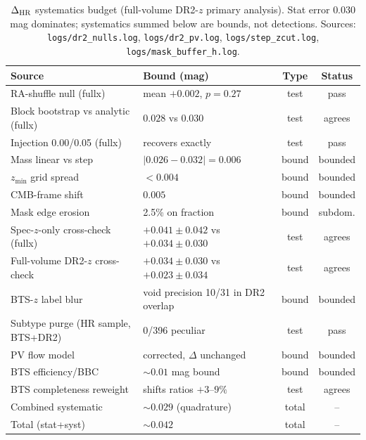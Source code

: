 \begin{table}
\caption{$\Delta_{\rm HR}$ systematics budget (full-volume DR2-$z$ primary analysis). Stat error $0.030$ mag dominates; systematics summed below are bounds, not detections. Sources: \texttt{logs/dr2\_nulls.log}, \texttt{logs/dr2\_pv.log}, \texttt{logs/step\_zcut.log}, \texttt{logs/mask\_buffer\_h.log}.}
\label{tab:budget}
{\small\setlength{\tabcolsep}{4pt}
\begin{tabular}{llcc}
\hline
Source & Bound (mag) & Type & Status \\
\hline
RA-shuffle null (fullx) & mean $+0.002$, $p=0.27$ & test & pass \\
Block bootstrap vs analytic (fullx) & $0.028$ vs $0.030$ & test & agrees \\
Injection 0.00/0.05 (fullx) & recovers exactly & test & pass \\
Mass linear vs step & $|0.026-0.032|=0.006$ & bound & bounded \\
$z_{\min}$ grid spread & $<0.004$ & bound & bounded \\
CMB-frame shift & $0.005$ & bound & bounded \\
Mask edge erosion & 2.5\% on fraction & bound & subdom. \\
Spec-$z$-only cross-check (fullx) & $+0.041\pm0.042$ vs $+0.034\pm0.030$ & test & agrees \\
Full-volume DR2-$z$ cross-check & $+0.034\pm0.030$ vs $+0.023\pm0.034$ & test & agrees \\
BTS-$z$ label blur & void precision 10/31 in DR2 overlap & bound & bounded \\
Subtype purge (HR sample, BTS+DR2) & 0/396 peculiar & test & pass \\
PV flow model & corrected, $\Delta$ unchanged & bound & bounded \\
BTS efficiency/BBC & $\sim0.01$ mag bound & bound & bounded \\
BTS completeness reweight & shifts ratios $+3$--$9\%$ & test & agrees \\
Combined systematic & $\sim0.029$ (quadrature) & total & -- \\
Total (stat+syst) & $\sim0.042$ & total & -- \\
\hline
\end{tabular}}
\end{table}
